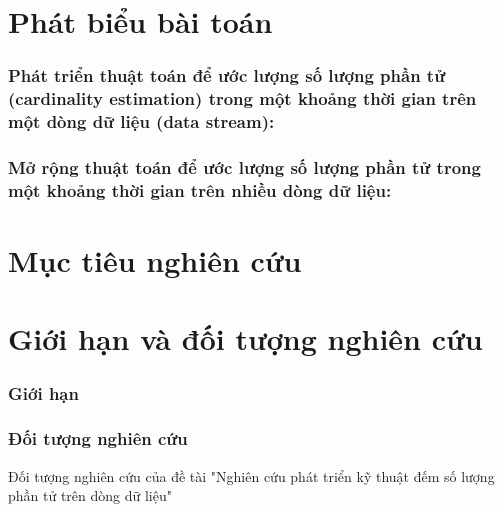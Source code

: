 \documentclass[letterpaper,13pt]{article}
\theoremstyle{mytheor}
\begin{document}
\section{Phát biểu bài toán}
\subsubsection{Phát triển thuật toán để ước lượng số lượng phần tử (cardinality estimation) trong một khoảng thời gian trên một dòng dữ liệu (data stream):}
\subsubsection{Mở rộng thuật toán để ước lượng số lượng phần tử trong một khoảng thời gian trên nhiều dòng dữ liệu:}
\section{Mục tiêu nghiên cứu}
\section{Giới hạn và đối tượng nghiên cứu }
\subsubsection{Giới hạn}
\subsubsection{Đối tượng nghiên cứu }
Đối tượng nghiên cứu của đề tài "Nghiên cứu phát triển kỹ thuật đếm số lượng phần tử trên dòng dữ liệu"
\end{document}
